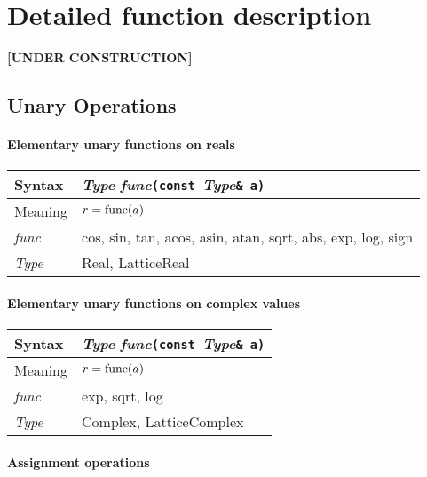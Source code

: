 \documentclass[12pt,letterpaper]{article}
\newcommand{\tLatticeReal}{LatticeReal}
\newcommand{\tLatticeComplex}{LatticeComplex}
\newcommand{\tReal}{Real}
\newcommand{\tComplex}{Complex}
\newcommand{\itt}{\it Type}
\newcommand{\protoUnary}{{\it Type }{\it func}{\tt (const }{\it Type}{\tt \& a)}}
\begin{document}
\section{Detailed function description}
\label{sec:details}

{\bf \Large [UNDER CONSTRUCTION]}


\subsection{Unary Operations}

\paragraph{Elementary unary functions on reals}

\begin{flushleft}
  \begin{tabular}{|l|l|}
  \hline
  Syntax      & \protoUnary  \\
  \hline
  Meaning     & $r = {\rm func}(a)$ \\
  \hline
  {\it func}  & cos, sin, tan, acos, asin, atan,
		sqrt, abs, exp, log, sign \\
  \hline
  \itt        & \tReal, \tLatticeReal \\
  \hline
  \end{tabular}
\end{flushleft}


\paragraph{Elementary unary functions on complex values}

\begin{flushleft}
  \begin{tabular}{|l|l|}
  \hline
  Syntax      & \protoUnary  \\
  \hline
  Meaning     & $r = {\rm func}(a)$ \\
  \hline
  {\it func}  & exp, sqrt, log \\
  \hline
  \itt        & \tComplex, \tLatticeComplex \\
  \hline
  \end{tabular}
\end{flushleft}

\paragraph{Assignment operations}
\end{document}
